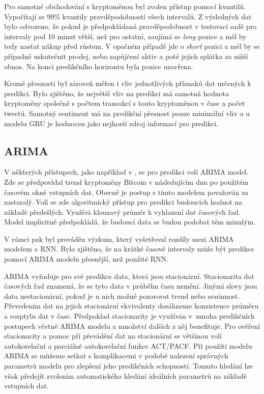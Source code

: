 Pro samotné obchodování s kryptoměnou byl zvolen přístup pomocí kvantilů. 
Vypočítají se 99\% kvantily pravděpodobností všech intervalů. 
Z výsledných dat bylo odvozeno, že pokud je předpokládaná pravděpodobnost v testovací sadě pro intervaly pod 10 minut větší, než pro ostatní, zaujímá se \textit{long} pozice a měl by tedy nastat nákup před růstem. 
V opačném případě jde o \textit{short} pozici a měl by se případně uskutečnit prodej, nebo zapůjčení aktiv a poté jejich splátka za nižší obnos. 
Na konci predikčního horizontu byla pozice uzavřena. 

Kromě přesnosti byl zároveň měřen i vliv jednotlivých příznaků dat určených k predikci. 
Bylo zjištěno, že největší vliv na predikci má samotná hodnota kryptoměny společně s počtem transakcí s touto kryptoměnou v čase a počet tweetů.
Samotný sentiment má na predikční přesnost pouze minimální vliv a u modelu GRU je hodnocen jako nejhorší zdroj informací pro predikci.

\subsection{ARIMA}

V některých přístupech, jako například v  \cite{arima}, se pro predikci volí ARIMA model. 
Zde se předpovídal trend kryptoměny Bitcoin v následujícím dnu po použitém časovém okně vstupních dat. 
Obecně je postup s tímto modelem považován za zastaralý. 
Volí se zde algoritmický přístup pro predikci budoucích hodnot na základě předešlých. 
Využívá klouzavý průměr k vyhlazení dat časových řad. 
Model implicitně předpokládá, že budoucí data se budou podobat těm minulým.

V rámci  pak byl prováděn výzkum, který vyšetřoval rozdíly mezi ARIMA modelem a RNN.
Bylo zjištěno, že na krátké časové intervaly může být predikce pomocí ARIMA modelu přesnější, než použité RNN.

ARIMA vyžaduje pro své predikce data, která jsou stacionární. 
Stacionarita dat časových řad znamená, že se tyto data v průběhu času nemění. 
Jinými slovy jsou data nestacionární, pokud je u nich možné pozorovat trend nebo sezónnost. 
Převedením dat na jejich stacionární ekvivalenty dosáhneme konzistence průměru a rozptylu dat v čase. 
Předpoklad stacionarity je využíván v~mnoha predikčních postupech včetně ARIMA modelu a množství dalších z něj benefituje. 
Pro ověření stacionarity a pomoc při převádění dat na stacionární se většinou volí autokorelační a parciálně autokorelační funkce ACT/PACF. 
Při použití modelu ARIMA se můžeme setkat s komplikacemi v podobě nalezení správných parametrů modelu pro zlepšení jeho predikčních schopností. 
Tomuto hledání lze však předejít zvolením automatického hledání ideálních parametrů na základě vstupních dat.

